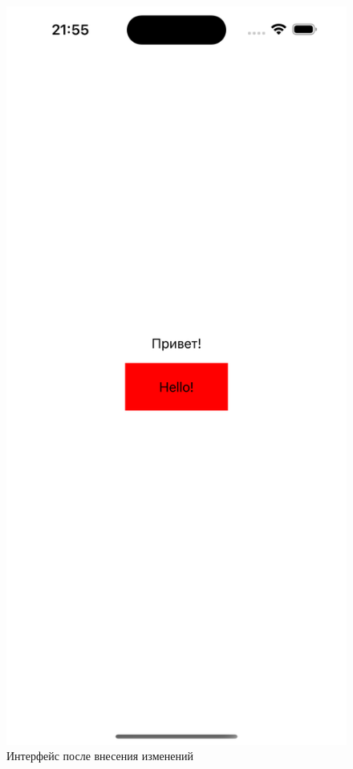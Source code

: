 \begin{figure}[!htb]
	\centering
	\includegraphics[scale=0.1]{img/example-after.png}
	\caption{Интерфейс после внесения изменений}
	\label{fig:example-after}
\end{figure}

